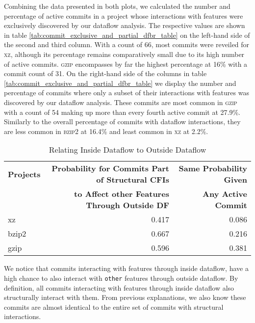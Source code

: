 Combining the data presented in both plots, we calculated the number and percentage of active commits in a project whose interactions with features were exclusively discovered by our dataflow analysis.
The respective values are shown in table \ref{tab:commit_exclusive_and_partial_dfbr_table} on the left-hand side of the second and third column.
With a count of 66, most commits were reveiled for \textsc{xz}, although its percentage remains comparatively small due to its high number of active commits.
\textsc{gzip} encompasses by far the highest percentage at 16\% with a commit count of 31.
On the right-hand side of the columns in table \ref{tab:commit_exclusive_and_partial_dfbr_table} we display the number and percentage of commits where only a subset of their interactions with features was discovered by our dataflow analysis.
These commits are most common in \textsc{gzip} with a count of 54 making up more than every fourth active commit at 27.9\%.
Similarly to the overall percentage of commits with dataflow interactions, they are less common in \textsc{bzip2} at 16.4\% and least common in \textsc{xz} at 2.2\%. \\
\begin{table}[t]
\caption{Relating Inside Dataflow to Outside Dataflow}
\label{tab:commit_dfbr_rel_table}
\centering
\begin{tabular}{l r r}
\toprule
\textbf{Projects} & \textbf{Probability for Commits Part of Structural CFIs} & \textbf{Same Probability Given} \\ 
 		  & \textbf{to Affect other Features Through Outside DF}     & \textbf{Any Active Commit} \\
\midrule
  xz    & 0.417 & 0.086 \\
  bzip2 & 0.667 & 0.216 \\
  gzip  & 0.596 & 0.381 \\
\bottomrule
\end{tabular}
\end{table}
We notice that commits interacting with features through inside dataflow, have a high chance to also interact with \texttt{other} features through outside dataflow.
By definition, all commits interacting with features through inside dataflow also structurally interact with them.
From previous explanations, we also know these commits are almost identical to the entire set of commits with structural interactions.
